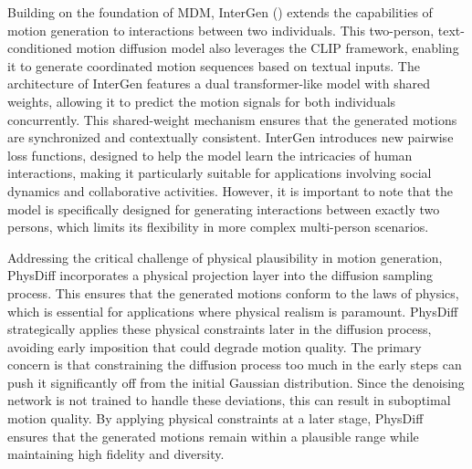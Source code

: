 Building on the foundation of MDM, InterGen (\cite{liang2024intergen}) extends the capabilities of motion generation to interactions between two individuals. This two-person, text-conditioned motion diffusion model also leverages the CLIP framework, enabling it to generate coordinated motion sequences based on textual inputs. The architecture of InterGen features a dual transformer-like model with shared weights, allowing it to predict the motion signals for both individuals concurrently. This shared-weight mechanism ensures that the generated motions are synchronized and contextually consistent. InterGen introduces new pairwise loss functions, designed to help the model learn the intricacies of human interactions, making it particularly suitable for applications involving social dynamics and collaborative activities. However, it is important to note that the model is specifically designed for generating interactions between exactly two persons, which limits its flexibility in more complex multi-person scenarios.

Addressing the critical challenge of physical plausibility in motion generation, PhysDiff \cite{yuan2023physdiff} incorporates a physical projection layer into the diffusion sampling process. This ensures that the generated motions conform to the laws of physics, which is essential for applications where physical realism is paramount. PhysDiff strategically applies these physical constraints later in the diffusion process, avoiding early imposition that could degrade motion quality. The primary concern is that constraining the diffusion process too much in the early steps can push it significantly off from the initial Gaussian distribution. Since the denoising network is not trained to handle these deviations, this can result in suboptimal motion quality. By applying physical constraints at a later stage, PhysDiff ensures that the generated motions remain within a plausible range while maintaining high fidelity and diversity.







